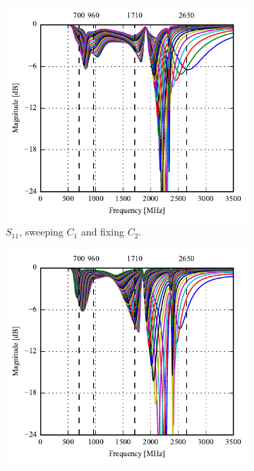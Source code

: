 \begin{figure}[htbp]
   \begin{subfigure}[b]{0.49\linewidth}
        \centering
        \includegraphics{img/tech_sol/monopole/highband/ue/talkmode/s11.pdf}
        \caption{$S_{11}$, sweeping $C_1$ and fixing $C_2$.}
    \end{subfigure}
    \hfill
    \begin{subfigure}[b]{0.49\linewidth}
        \centering
        \includegraphics{img/tech_sol/monopole/highband/ue/talkmode/s22.pdf}

\end{subfigure}
\end{figure}
